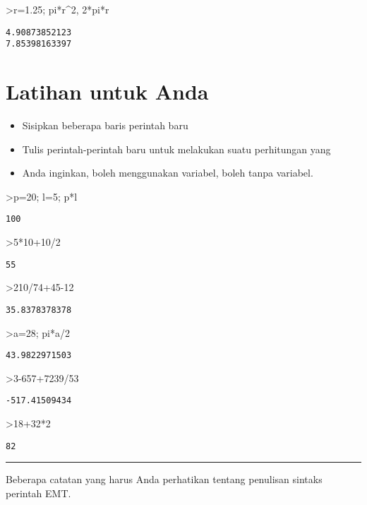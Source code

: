 \documentclass[
]{book}
\begin{document}
\textgreater r=1.25; pi*r\^{}2, 2*pi*r

\begin{verbatim}
4.90873852123
7.85398163397
\end{verbatim}

\section{Latihan untuk Anda}\label{latihan-untuk-anda}

\begin{itemize}
\item
  Sisipkan beberapa baris perintah baru
\item
  Tulis perintah-perintah baru untuk melakukan suatu perhitungan yang
\item
  Anda inginkan, boleh menggunakan variabel, boleh tanpa variabel.
\end{itemize}

\textgreater p=20; l=5; p*l

\begin{verbatim}
100
\end{verbatim}

\textgreater5*10+10/2

\begin{verbatim}
55
\end{verbatim}

\textgreater210/74+45-12

\begin{verbatim}
35.8378378378
\end{verbatim}

\textgreater a=28; pi*a/2

\begin{verbatim}
43.9822971503
\end{verbatim}

\textgreater3-657+7239/53

\begin{verbatim}
-517.41509434
\end{verbatim}

\textgreater18+32*2

\begin{verbatim}
82
\end{verbatim}

\begin{center}\rule{0.5\linewidth}{0.5pt}\end{center}

Beberapa catatan yang harus Anda perhatikan tentang penulisan sintaks perintah EMT.
\end{document}

